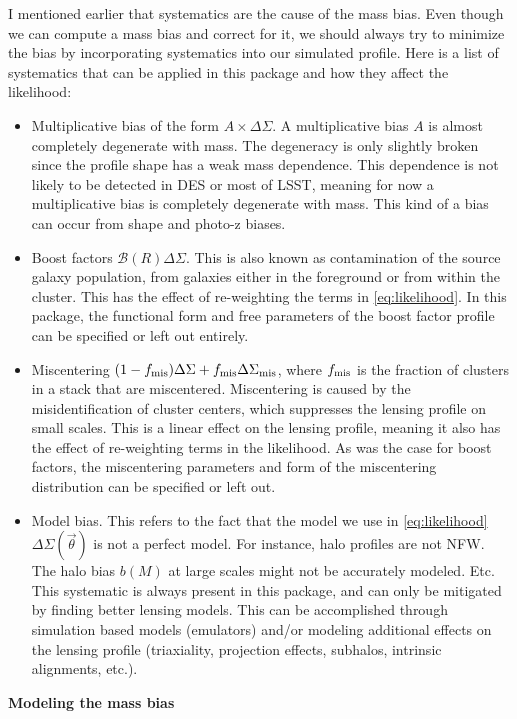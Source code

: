 \documentclass[12pt]{article}
\newcommand{\ds}{\Delta\Sigma}
\newcommand{\model}{\vec{\theta}}
\begin{document}
I mentioned earlier that systematics are the cause of the mass bias. Even though we can compute a mass bias and correct for it, we should always try to minimize the bias by incorporating systematics into our simulated profile. Here is a list of systematics that can be applied in this package and how they affect the likelihood:
%
\begin{itemize}
\item Multiplicative bias of the form $A\times\ds$. A multiplicative bias $A$ is almost completely degenerate with mass. The degeneracy is only slightly broken since the profile shape has a weak mass dependence. This dependence is not likely to be detected in DES or most of LSST, meaning for now a multiplicative bias is completely degenerate with mass. This kind of a bias can occur from shape and photo-z biases.
\item Boost factors $\mathcal{B}(R)\ds$. This is also known as contamination of the source galaxy population, from galaxies either in the foreground or from within the cluster. This has the effect of re-weighting the terms in \autoref{eq:likelihood}. In this package, the functional form and free parameters of the boost factor profile can be specified or left out entirely.
\item Miscentering $(1-f_{\rm mis})\ds + f_{\rm mis}\ds_{\rm mis}$, where $f_{\rm mis}$ is the fraction of clusters in a stack that are miscentered. Miscentering is caused by the misidentification of cluster centers, which suppresses the lensing profile on small scales. This is a linear effect on the lensing profile, meaning it also has the effect of re-weighting terms in the likelihood. As was the case for boost factors, the miscentering parameters and form of the miscentering distribution can be specified or left out.
\item Model bias. This refers to the fact that the model we use in \autoref{eq:likelihood} $\ds(\model)$ is not a perfect model. For instance, halo profiles are not NFW. The halo bias $b(M)$ at large scales might not be accurately modeled. Etc. This systematic is always present in this package, and can only be mitigated by finding better lensing models. This can be accomplished through simulation based models (emulators) and/or modeling additional effects on the lensing profile (triaxiality, projection effects, subhalos, intrinsic alignments, etc.).
\end{itemize}
%

\vspace{12pt}
\noindent
{\bf Modeling the mass bias}
\end{document}

